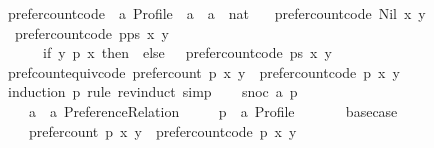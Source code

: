 \begin{isabellebody}
\isanewline
{}\isamarkupfalse%
\ prefer{\isacharunderscore}{\kern0pt}count{\isacharunderscore}{\kern0pt}code\ {\isacharcolon}{\kern0pt}{\isacharcolon}{\kern0pt}\ {\isachardoublequoteopen}{\isacharprime}{\kern0pt}a\ Profile\ {\isasymRightarrow}\ {\isacharprime}{\kern0pt}a\ {\isasymRightarrow}\ {\isacharprime}{\kern0pt}a\ {\isasymRightarrow}\ nat{\isachardoublequoteclose}\ \isanewline
\ \ {\isachardoublequoteopen}prefer{\isacharunderscore}{\kern0pt}count{\isacharunderscore}{\kern0pt}code\ Nil\ x\ y\ {\isacharequal}{\kern0pt}\ {}{\isachardoublequoteclose}\ {\isacharbar}{\kern0pt}\isanewline
\ \ {\isachardoublequoteopen}prefer{\isacharunderscore}{\kern0pt}count{\isacharunderscore}{\kern0pt}code\ {\isacharparenleft}{\kern0pt}p{\isacharhash}{\kern0pt}ps{\isacharparenright}{\kern0pt}\ x\ y\ {\isacharequal}{\kern0pt}\isanewline
\ \ \ \ \ \ {\isacharparenleft}{\kern0pt}if\ y\ {\isasympreceq}\isactrlsub p\ x\ then\ {}\ else\ {}{\isacharparenright}{\kern0pt}\ {\isacharplus}{\kern0pt}\ prefer{\isacharunderscore}{\kern0pt}count{\isacharunderscore}{\kern0pt}code\ ps\ x\ y{\isachardoublequoteclose}\isanewline
\isanewline
{}\isamarkupfalse%
\ pref{\isacharunderscore}{\kern0pt}count{\isacharunderscore}{\kern0pt}equiv{\isacharbrackleft}{\kern0pt}code{\isacharbrackright}{\kern0pt}{\isacharcolon}{\kern0pt}\ {\isachardoublequoteopen}prefer{\isacharunderscore}{\kern0pt}count\ p\ x\ y\ {\isacharequal}{\kern0pt}\ prefer{\isacharunderscore}{\kern0pt}count{\isacharunderscore}{\kern0pt}code\ p\ x\ y{\isachardoublequoteclose}\isanewline
%
\isadelimproof
%
\endisadelimproof
%
\isatagproof
{}\isamarkupfalse%
\ {\isacharparenleft}{\kern0pt}induction\ p\ rule{\isacharcolon}{\kern0pt}\ rev{\isacharunderscore}{\kern0pt}induct{\isacharcomma}{\kern0pt}\ simp{\isacharparenright}{\kern0pt}\isanewline
\ \ \isamarkupfalse%
\ {\isacharparenleft}{\kern0pt}snoc\ a\ p{\isacharparenright}{\kern0pt}\isanewline
\ \ \isamarkupfalse%
\isanewline
\ \ \ \ a\ {\isacharcolon}{\kern0pt}{\isacharcolon}{\kern0pt}\ {\isachardoublequoteopen}{\isacharprime}{\kern0pt}a\ Preference{\isacharunderscore}{\kern0pt}Relation{\isachardoublequoteclose}\ \isanewline
\ \ \ \ p\ {\isacharcolon}{\kern0pt}{\isacharcolon}{\kern0pt}\ {\isachardoublequoteopen}{\isacharprime}{\kern0pt}a\ Profile{\isachardoublequoteclose}\isanewline
\ \ \isamarkupfalse%
\isanewline
\ \ \ \ base{\isacharunderscore}{\kern0pt}case{\isacharcolon}{\kern0pt}\isanewline
\ \ \ \ {\isachardoublequoteopen}prefer{\isacharunderscore}{\kern0pt}count\ p\ x\ y\ {\isacharequal}{\kern0pt}\ prefer{\isacharunderscore}{\kern0pt}count{\isacharunderscore}{\kern0pt}code\ p\ x\ y{\isachardoublequoteclose}\isanewline

\end{isabellebody}
